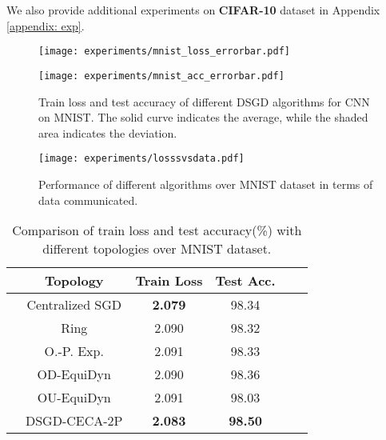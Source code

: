 \documentclass{article}
\theoremstyle{plain}
\theoremstyle{definition}
\begin{document}
We also provide additional experiments on \textbf{CIFAR-10} dataset \cite{Krizhevsky09} in Appendix \ref{appendix: exp}. \vskip -0.1in

\begin{figure}[ht]
\vskip -0in
\begin{center}
\centerline{\texttt{[image: experiments/mnist\_loss\_errorbar.pdf]}}
\centerline{\texttt{[image: experiments/mnist\_acc\_errorbar.pdf]}}
\vskip -0.1in
\caption{Train loss and test accuracy of different DSGD algorithms for CNN on MNIST. The solid curve indicates the average, while the shaded area indicates the deviation.}
\label{fig:mnist}
\end{center}
\vskip -0.1in
\end{figure}

\begin{figure}[ht]
\begin{center}
\centerline{\texttt{[image: experiments/losssvsdata.pdf]}}\vskip -0.1in
\caption{Performance of different algorithms over MNIST dataset in terms of data communicated.}
\label{fig:losssvsdata}
\end{center}
\vskip -0.25in
\end{figure}

\setlength{\tabcolsep}{4pt}
\begin{table}[h!]
    \centering 
    \caption{\small Comparison of train loss and test accuracy(\%) with different topologies over MNIST dataset.}
    \vspace{2mm}
	\begin{tabular}{rccccc}
		\toprule
		&\textbf{Topology} &  \textbf{Train Loss}  & \textbf{Test Acc.} &\\ \midrule
		&Centralized SGD &   \textbf{2.079}  &  98.34  & \\ \hdashline
		&Ring        &    2.090      &  98.32  &   \\ 
		&O.-P. Exp.    &     2.091      & 98.33   &  \\  
		&OD-EquiDyn  &     2.090 &  98.36  & \\ 
		&OU-EquiDyn   &    2.091       &   98.03    &    \\ 	
            &DSGD-CECA-2P   &    \textbf{2.083}       &   \textbf{98.50} &  \\
		\bottomrule
	\end{tabular}
	\label{table:deep_learning_mnist}
\end{table}
\end{document}
